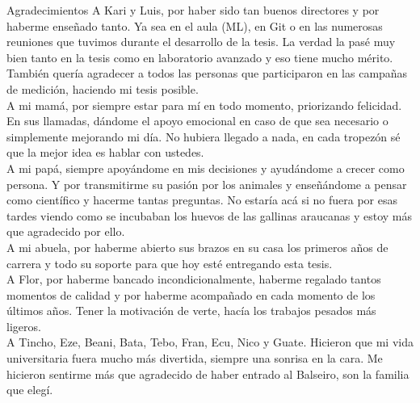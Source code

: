 \documentclass[12pt,screen,twoside,pagebackref]{ibtesis}
\begin{document}
\begin{postliminary}


\begin{seccion}{Agradecimientos}
A Kari y Luis, por haber sido tan buenos directores y por haberme enseñado tanto. Ya sea en el aula (ML), en Git o en las numerosas reuniones que tuvimos durante el desarrollo de la tesis. La verdad la pasé muy bien tanto en la tesis como en laboratorio avanzado y eso tiene mucho mérito. También quería agradecer a todos las personas que participaron en las campañas de medición, haciendo mi tesis posible. \\

A mi mamá, por siempre estar para mí en todo momento, priorizando felicidad. En sus llamadas, dándome el apoyo emocional en caso de que sea necesario o simplemente mejorando mi día. No hubiera llegado a nada, en cada tropezón sé que la mejor idea es hablar con ustedes. \\

A mi papá, siempre apoyándome en mis decisiones y ayudándome a crecer como persona. Y por transmitirme su pasión por los animales y enseñándome a pensar como científico y hacerme tantas preguntas. No estaría acá si no fuera por esas tardes viendo como se incubaban los huevos de las gallinas araucanas y estoy más que agradecido por ello. \\

A mi abuela, por haberme abierto sus brazos en su casa los primeros años de carrera y todo su soporte para que hoy esté entregando esta tesis.\\

A Flor, por haberme bancado incondicionalmente, haberme regalado tantos momentos de calidad y por haberme acompañado en cada momento de los últimos años. Tener la motivación de verte, hacía los trabajos pesados más ligeros. \\

A Tincho, Eze, Beani, Bata, Tebo, Fran, Ecu, Nico y Guate. Hicieron que mi vida universitaria fuera mucho más divertida, siempre una sonrisa en la cara. Me hicieron sentirme más que agradecido de haber entrado al Balseiro, son la familia que elegí. 
\end{seccion}

\end{postliminary}
\end{document}
